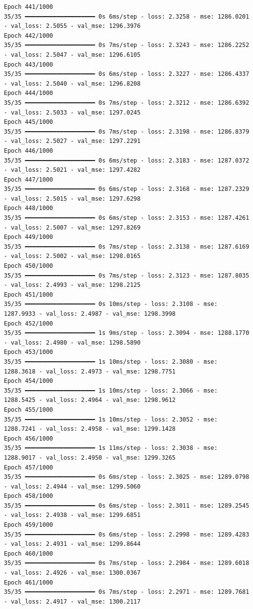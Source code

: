 \documentclass[
  letterpaper,
  DIV=11,
  numbers=noendperiod]{scrreprt}
\begin{document}
\begin{verbatim}
Epoch 441/1000
35/35 ━━━━━━━━━━━━━━━━━━━━ 0s 6ms/step - loss: 2.3258 - mse: 1286.0201 - val_loss: 2.5055 - val_mse: 1296.3976
Epoch 442/1000
35/35 ━━━━━━━━━━━━━━━━━━━━ 0s 7ms/step - loss: 2.3243 - mse: 1286.2252 - val_loss: 2.5047 - val_mse: 1296.6105
Epoch 443/1000
35/35 ━━━━━━━━━━━━━━━━━━━━ 0s 6ms/step - loss: 2.3227 - mse: 1286.4337 - val_loss: 2.5040 - val_mse: 1296.8208
Epoch 444/1000
35/35 ━━━━━━━━━━━━━━━━━━━━ 0s 7ms/step - loss: 2.3212 - mse: 1286.6392 - val_loss: 2.5033 - val_mse: 1297.0245
Epoch 445/1000
35/35 ━━━━━━━━━━━━━━━━━━━━ 0s 7ms/step - loss: 2.3198 - mse: 1286.8379 - val_loss: 2.5027 - val_mse: 1297.2291
Epoch 446/1000
35/35 ━━━━━━━━━━━━━━━━━━━━ 0s 6ms/step - loss: 2.3183 - mse: 1287.0372 - val_loss: 2.5021 - val_mse: 1297.4282
Epoch 447/1000
35/35 ━━━━━━━━━━━━━━━━━━━━ 0s 6ms/step - loss: 2.3168 - mse: 1287.2329 - val_loss: 2.5015 - val_mse: 1297.6298
Epoch 448/1000
35/35 ━━━━━━━━━━━━━━━━━━━━ 0s 6ms/step - loss: 2.3153 - mse: 1287.4261 - val_loss: 2.5007 - val_mse: 1297.8269
Epoch 449/1000
35/35 ━━━━━━━━━━━━━━━━━━━━ 0s 7ms/step - loss: 2.3138 - mse: 1287.6169 - val_loss: 2.5002 - val_mse: 1298.0165
Epoch 450/1000
35/35 ━━━━━━━━━━━━━━━━━━━━ 0s 7ms/step - loss: 2.3123 - mse: 1287.8035 - val_loss: 2.4993 - val_mse: 1298.2125
Epoch 451/1000
35/35 ━━━━━━━━━━━━━━━━━━━━ 0s 10ms/step - loss: 2.3108 - mse: 1287.9933 - val_loss: 2.4987 - val_mse: 1298.3998
Epoch 452/1000
35/35 ━━━━━━━━━━━━━━━━━━━━ 1s 9ms/step - loss: 2.3094 - mse: 1288.1770 - val_loss: 2.4980 - val_mse: 1298.5890
Epoch 453/1000
35/35 ━━━━━━━━━━━━━━━━━━━━ 1s 10ms/step - loss: 2.3080 - mse: 1288.3618 - val_loss: 2.4973 - val_mse: 1298.7751
Epoch 454/1000
35/35 ━━━━━━━━━━━━━━━━━━━━ 1s 10ms/step - loss: 2.3066 - mse: 1288.5425 - val_loss: 2.4964 - val_mse: 1298.9612
Epoch 455/1000
35/35 ━━━━━━━━━━━━━━━━━━━━ 1s 10ms/step - loss: 2.3052 - mse: 1288.7241 - val_loss: 2.4958 - val_mse: 1299.1428
Epoch 456/1000
35/35 ━━━━━━━━━━━━━━━━━━━━ 1s 11ms/step - loss: 2.3038 - mse: 1288.9017 - val_loss: 2.4950 - val_mse: 1299.3265
Epoch 457/1000
35/35 ━━━━━━━━━━━━━━━━━━━━ 0s 6ms/step - loss: 2.3025 - mse: 1289.0798 - val_loss: 2.4944 - val_mse: 1299.5060
Epoch 458/1000
35/35 ━━━━━━━━━━━━━━━━━━━━ 0s 6ms/step - loss: 2.3011 - mse: 1289.2545 - val_loss: 2.4938 - val_mse: 1299.6851
Epoch 459/1000
35/35 ━━━━━━━━━━━━━━━━━━━━ 0s 6ms/step - loss: 2.2998 - mse: 1289.4283 - val_loss: 2.4931 - val_mse: 1299.8644
Epoch 460/1000
35/35 ━━━━━━━━━━━━━━━━━━━━ 0s 7ms/step - loss: 2.2984 - mse: 1289.6018 - val_loss: 2.4926 - val_mse: 1300.0367
Epoch 461/1000
35/35 ━━━━━━━━━━━━━━━━━━━━ 0s 7ms/step - loss: 2.2971 - mse: 1289.7681 - val_loss: 2.4917 - val_mse: 1300.2117

\end{verbatim}
\end{document}
